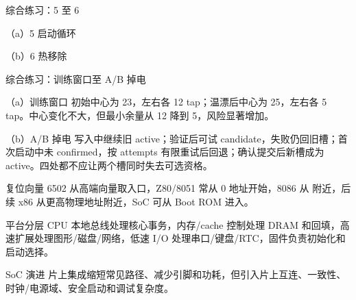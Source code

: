 \begin{chapteranswer}{综合练习：5 至 6}
\begin{answersubproblem}{（a）5}
启动循环
\end{answersubproblem}
\begin{answersubproblem}{（b）6}
热移除
\end{answersubproblem}
\end{chapteranswer}

\begin{chapteranswer}{综合练习：训练窗口至 A/B 掉电}
\begin{answersubproblem}{（a）训练窗口}
初始中心为 23，左右各 12 tap；温漂后中心为 25，左右各 5 tap。中心变化不大，但最小余量从 12 降到 5，风险显著增加。
\end{answersubproblem}
\begin{answersubproblem}{（b）A/B 掉电}
写入中继续旧 active；验证后可试 candidate，失败仍回旧槽；首次启动中未 confirmed，按 attempts 有限重试后回退；确认提交后新槽成为 active。四处都不应让两个槽同时失去可选资格。
\end{answersubproblem}
\end{chapteranswer}

\begin{chapteranswer}{复位向量}
6502 从高端向量取入口，Z80/8051 常从 0 地址开始，8086 从  附近，后续 x86 从更高物理地址附近，SoC 可从 Boot ROM 进入。
\end{chapteranswer}

\begin{chapteranswer}{平台分层}
CPU 本地总线处理核心事务，内存/cache 控制处理 DRAM 和回填，高速扩展处理图形/磁盘/网络，低速 I/O 处理串口/键盘/RTC，固件负责初始化和启动选择。
\end{chapteranswer}

\begin{chapteranswer}{SoC 演进}
片上集成缩短常见路径、减少引脚和功耗，但引入片上互连、一致性、时钟/电源域、安全启动和调试复杂度。
\end{chapteranswer}

